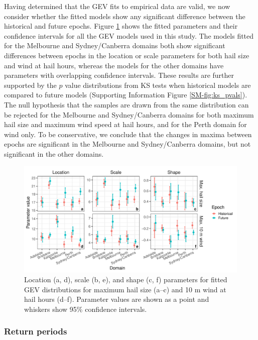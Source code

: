 \documentclass[]{agujournal2019}\usepackage[]{graphicx}\usepackage[]{xcolor}
\begin{document}
Having determined that the GEV fits to empirical data are valid, we now consider
whether the fitted models show any significant difference between the historical
and future epochs. Figure \ref{fig:gev_parameters} shows the fitted parameters
and their confidence intervals for all the GEV models used in this study. The
models fitted for the Melbourne and Sydney/Canberra domains both show
significant differences between epochs in the location or scale parameters for
both hail size and wind at hail hours, whereas the models for the other domains
have parameters with overlapping confidence intervals. These results are further
supported by the $p$ value distributions from KS tests when historical models
are compared to future models (Supporting Information Figure
\ref{SM-fig:ks_pvals}). The null hypothesis that the samples are drawn from the
same distribution can be rejected for the Melbourne and Sydney/Canberra domains
for both maximum hail size and maximum wind speed at hail hours, and for the
Perth domain for wind only. To be conservative, we conclude that the changes in
maxima between epochs are significant in the Melbourne and Sydney/Canberra
domains, but not significant in the other domains.

\begin{figure}[!ht]
      \includegraphics[width=\textwidth]{figures/fit_params}
      \caption{Location (a, d), scale (b, e), and shape (c, f) parameters for
      fitted GEV distributions for maximum hail size (a--c) and 10 m wind at
      hail hours (d--f). Parameter values are shown as a point and whiskers show
      95\% confidence intervals.}
      \label{fig:gev_parameters}
\end{figure}

\subsubsection{Return periods}
\end{document}

